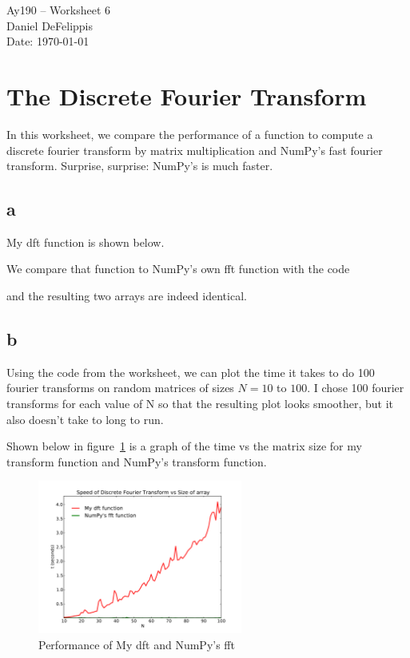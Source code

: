 \documentclass[11pt,letterpaper]{article}
\begin{document}
\begin{center}
\Large
Ay190 -- Worksheet 6\\
Daniel DeFelippis\\
Date: \today
\end{center}


\section{The Discrete Fourier Transform}

In this worksheet, we compare the performance of a function to compute a
discrete fourier transform by matrix multiplication and NumPy's fast fourier
transform. Surprise, surprise: NumPy's is much faster.

\subsection*{a}

My dft function is shown below. 


We compare that function to NumPy's own fft function with the code

and the resulting two arrays are indeed identical. 

\subsection*{b}

Using the code from the worksheet, we can plot the time it takes to do 
100 fourier transforms on random matrices of sizes $N = 10$ to $100$.
I chose 100 fourier transforms for each value of N so that the resulting plot 
looks smoother, but it also doesn't take to long to run.

Shown below in figure~\ref{fig:6b} is a graph of the time vs the matrix size for my
transform function and NumPy's transform function. 

\begin{figure}[bth]
\centering
\includegraphics[width=0.6\textwidth]{ws6-b.pdf}
\caption{Performance of My dft and NumPy's fft}
\label{fig:6b}
\end{figure}
\end{document}
